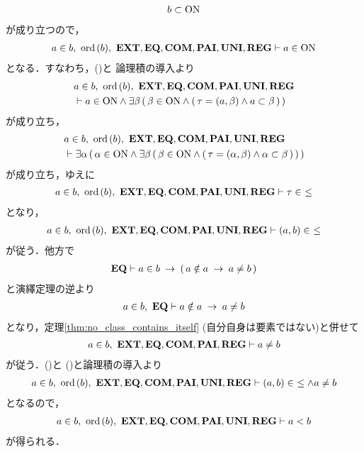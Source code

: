 \begin{prf}
\begin{description}
\begin{align}
					b \subset \mathrm{ON}
				\end{align}
				が成り立つので，
				\begin{align}
					a \in b,\ \ord{b},\ \EXTAX,\EQAX,\COMAX,\PAIAX,\UNIAX,\REGAX 
					\vdash a \in \ON
				\end{align}
				となる．すなわち，()と
				論理積の導入より
				\begin{align}
					&a \in b,\ \ord{b},\ \EXTAX,\EQAX,\COMAX,\PAIAX,\UNIAX,\REGAX \\
					&\vdash a \in \ON \wedge \exists \beta\, (\, \beta \in \ON \wedge 
					(\, \tau = (a,\beta) \wedge a \subset \beta\, )\, )
				\end{align}
				が成り立ち，
				\begin{align}
					&a \in b,\ \ord{b},\ \EXTAX,\EQAX,\COMAX,\PAIAX,\UNIAX,\REGAX \\
					&\vdash \exists \alpha\, (\, \alpha \in \ON \wedge 
					\exists \beta\, (\, \beta \in \ON \wedge 
					(\, \tau = (\alpha,\beta) \wedge \alpha \subset \beta\, )\, )\, )
				\end{align}
				が成り立ち，ゆえに
				\begin{align}
					a \in b,\ \ord{b},\ \EXTAX,\EQAX,\COMAX,\PAIAX,\UNIAX,\REGAX 
					\vdash \tau \in\ \leq
				\end{align}
				となり，
				\begin{align}
					a \in b,\ \ord{b},\ \EXTAX,\EQAX,\COMAX,\PAIAX,\UNIAX,\REGAX 
					\vdash (a,b) \in\ \leq
					\label{fom:element_and_proper_subset_correspond_3}
				\end{align}
				が従う．他方で
				\begin{align}
					\mbox{{\bf EQ}} \vdash a \in b \hspace{0.25em}\rightarrow\hspace{0.25em} (\, a \notin a \hspace{0.25em}\rightarrow\hspace{0.25em} a \neq b\, )
				\end{align}
				と演繹定理の逆より
				\begin{align}
					a \in b,\ \mbox{{\bf EQ}} \vdash a \notin a \hspace{0.25em}\rightarrow\hspace{0.25em} a \neq b
				\end{align}
				となり，定理\ref{thm:no_class_contains_itself}
				(自分自身は要素ではない)と併せて
				\begin{align}
					a \in b,\ \mbox{{\bf EXT}},\mbox{{\bf EQ}},\mbox{\bf COM},\mbox{{\bf PAI}},\mbox{{\bf REG}} \vdash 
					a \neq b
					\label{fom:element_and_proper_subset_correspond_4}
				\end{align}
				が従う．()と
				()と論理積の導入より
				\begin{align}
					a \in b,\ \ord{b},\ \EXTAX,\EQAX,\COMAX,\PAIAX,\UNIAX,\REGAX 
					\vdash (a,b) \in\ \leq \wedge a \neq b
				\end{align}
				となるので，
				\begin{align}
					a \in b,\ \ord{b},\ \EXTAX,\EQAX,\COMAX,\PAIAX,\UNIAX,\REGAX \vdash a < b
					\label{fom:element_and_proper_subset_correspond_21}
				\end{align}
				が得られる．
				

\end{description}
\end{prf}
